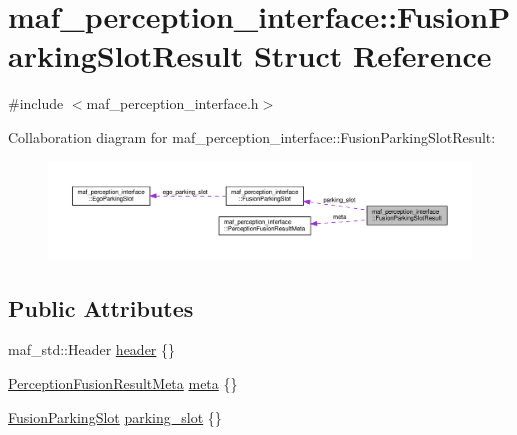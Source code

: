 \hypertarget{structmaf__perception__interface_1_1FusionParkingSlotResult}{}\section{maf\+\_\+perception\+\_\+interface\+:\+:Fusion\+Parking\+Slot\+Result Struct Reference}
\label{structmaf__perception__interface_1_1FusionParkingSlotResult}


{\ttfamily \#include $<$maf\+\_\+perception\+\_\+interface.\+h$>$}



Collaboration diagram for maf\+\_\+perception\+\_\+interface\+:\+:Fusion\+Parking\+Slot\+Result\+:\nopagebreak
\begin{figure}[H]
\begin{center}
\leavevmode
\includegraphics[width=350pt]{structmaf__perception__interface_1_1FusionParkingSlotResult__coll__graph}
\end{center}
\end{figure}
\subsection*{Public Attributes}
\begin{DoxyCompactItemize}
\item 
maf\+\_\+std\+::\+Header \hyperlink{structmaf__perception__interface_1_1FusionParkingSlotResult_aa1d362b8709b551a3230f80dd5215e33}{header} \{\}
\item 
\hyperlink{structmaf__perception__interface_1_1PerceptionFusionResultMeta}{Perception\+Fusion\+Result\+Meta} \hyperlink{structmaf__perception__interface_1_1FusionParkingSlotResult_a582ed1df2d1bc577abf5954a66dfbb6a}{meta} \{\}
\item 
\hyperlink{structmaf__perception__interface_1_1FusionParkingSlot}{Fusion\+Parking\+Slot} \hyperlink{structmaf__perception__interface_1_1FusionParkingSlotResult_aba687122ddc9b7fd7058710dcb8c21c1}{parking\+\_\+slot} \{\}
\end{DoxyCompactItemize}


